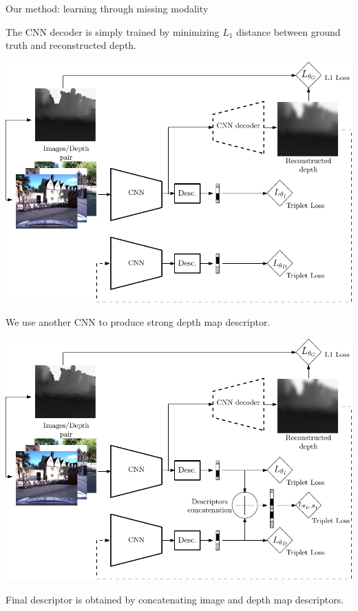 \begin{frame}{Our method: learning through missing modality}
{\begin{minipage}{0.3\linewidth}
		The CNN decoder is simply trained by minimizing $L_{1}$ distance between ground truth and reconstructed depth.
	\end{minipage}		
	
	}
	{
	\begin{minipage}{0.6\linewidth}
		\centering
		\includegraphics[width=\linewidth]{vect/method/fig3/3d}	
	\end{minipage}\hfill
	\begin{minipage}{0.3\linewidth}
		\raggedright
		We use another CNN to produce strong depth map descriptor.
	\end{minipage}			
	
	}
	{
	\begin{minipage}{0.6\linewidth}
		\centering
		\includegraphics[width=\linewidth]{vect/method/fig3/4d}	
	\end{minipage}\hfill
	\begin{minipage}{0.3\linewidth}
		\raggedright
		Final descriptor is obtained by concatenating image and depth map descriptors.
	\end{minipage}			
	
	}
\end{frame}

